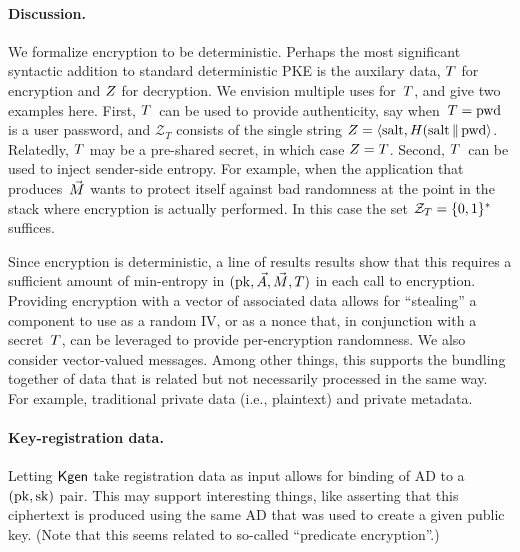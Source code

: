\paragraph{Discussion. } We formalize encryption to be deterministic. Perhaps the most significant syntactic addition to standard deterministic PKE is the auxilary data, $T$ for encryption and $Z$ for decryption.  We envision multiple uses for~$T$, and give two examples here.  First, $T$~can be used to provide authenticity, say when~$T=\mathrm{pwd}$ is a user password, and $\mathcal{Z}_T$ consists of the single string $Z=\langle \mathrm{salt},H(\mathrm{salt} \,\|\, \mathrm{pwd} \rangle$.  Relatedly, $T$ may be a pre-shared secret, in which case $Z=T$.  Second, $T$~can be used to inject sender-side entropy.  For example, when the application that produces~$\vec{M}$ wants to protect itself against bad randomness at the point in the stack where encryption is actually performed.  In this case the set $\mathcal{Z}_T=\{0,1\}^*$ suffices. 

Since encryption is deterministic, a line of results \cite{xxx,yyy,zzz} results show that this requires a sufficient amount of min-entropy in $(\mathrm{pk},\vec{A},\vec{M},T)$ in each call to encryption.  Providing encryption with a vector of associated data allows for ``stealing'' a component to use as a random IV, or as a nonce that, in conjunction with a secret~$T$, can be leveraged to provide per-encryption randomness.  We also consider vector-valued messages.  Among other things, this supports the bundling together of data that is related but not necessarily processed in the same way.  For example, traditional private data (i.e., plaintext) and private metadata.  

 
\paragraph{Key-registration data. } Letting $\mathsf{Kgen}$ take registration data as input allows for binding of AD to a $(\mathrm{pk},\mathrm{sk})$ pair.  This may support interesting things, like asserting that this ciphertext is produced using the same AD that was used to create a given public key.  (Note that this seems related to so-called ``predicate encryption''.)



